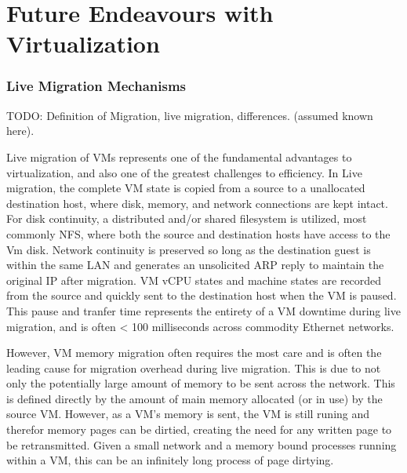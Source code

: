 
\chapter{Future Endeavours with Virtualization}
\label{chap:future-work}

\subsection{Live Migration Mechanisms}

TODO: Definition of Migration, live migration, differences. (assumed known here).

Live migration of VMs represents one of the fundamental advantages to virtualization, and also one of the greatest challenges to efficiency.  In Live migration, the complete VM state is copied from a source to a unallocated destination host, where disk, memory, and network connections are kept intact. For disk continuity, a distributed and/or shared filesystem is utilized, most commonly NFS, where both the source and destination hosts have access to the Vm disk.  Network continuity is preserved so long as the destination guest is within the same LAN and generates an unsolicited ARP reply to maintain the original IP after migration.  VM vCPU states and machine states are recorded from the source and quickly sent to the destination host when the VM is paused. This pause and tranfer time represents the entirety of a VM downtime during live migration, and is often < 100 milliseconds across  commodity Ethernet networks. 

However, VM memory migration often requires the most care and is often the leading cause for migration overhead during live migration. This is due to not only the potentially large amount of memory to be sent across the network.  This is defined directly by the amount of main memory allocated (or in use) by the source VM. However, as a VM's memory is sent, the VM is still runing and therefor memory pages can be dirtied, creating the need for any written page to be retransmitted. Given a small network and a memory bound processes running within a VM, this can be an infinitely long process of page dirtying. 

